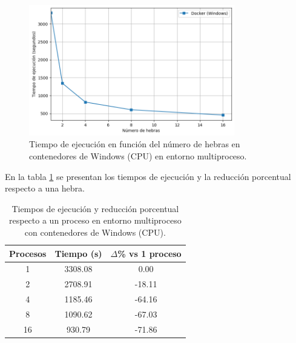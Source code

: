 \begin{figure}[H]
    \centering
    \includegraphics[width=0.8\textwidth]{imagenes/cap5/multi-node_windows_docker_time.png}
    \caption{Tiempo de ejecución en función del número de hebras en contenedores de Windows (CPU) en entorno multiproceso.}
    \label{fig:multi-node_windows_docker_time}
\end{figure}

En la tabla \ref{tab:multi-node_windows_docker} se presentan los tiempos de ejecución y la reducción porcentual respecto a una hebra.

\begin{table}[ht]
    \centering
    \begin{tabular}{|c|c|c|}
        \hline
        \textbf{Procesos} & \textbf{Tiempo (s)} & \textbf{$\Delta$\% vs 1 proceso} \\
        \hline
        1                 & 3308.08             & 0.00                             \\
        2                 & 2708.91             & -18.11                           \\
        4                 & 1185.46             & -64.16                           \\
        8                 & 1090.62             & -67.03                           \\
        16                & 930.79              & -71.86                           \\
        \hline
    \end{tabular}
    \caption{Tiempos de ejecución y reducción porcentual respecto a un proceso en entorno multiproceso con contenedores de Windows (CPU).}
    \label{tab:multi-node_windows_docker}
\end{table}


